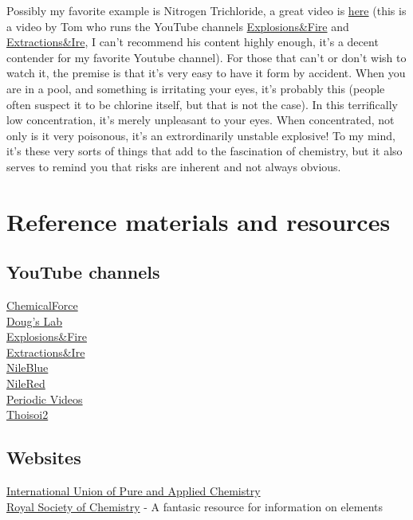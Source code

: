 \documentclass{book}
\begin{document}
Possibly my favorite example is Nitrogen Trichloride, a great video is \href{https://www.youtube.com/watch?v=mV_daaldE_I}{here} (this is a video by Tom who runs the YouTube channels \href{https://www.youtube.com/c/ExplosionsFire2}{Explosions\&Fire} and \href{https://www.youtube.com/c/ExtractionsIre}{Extractions\&Ire}, I can't recommend his content highly enough, it's a decent contender for my favorite Youtube channel).  For those that can't or don't wish to watch it, the premise is that it's very easy to have it form by accident.  When you are in a pool, and something is irritating your eyes, it's probably this (people often suspect it to be chlorine itself, but that is not the case).  In this terrifically low concentration, it's merely unpleasant to your eyes.  When concentrated, not only is it very poisonous, it's an extrordinarily unstable explosive!  To my mind, it's these very sorts of things that add to the fascination of chemistry, but it also serves to remind you that risks are inherent and not always obvious.\\
\section{Reference materials and resources}
\subsection{YouTube channels}
\href{https://www.youtube.com/c/ChemicalForce}{ChemicalForce}\\
\href{https://www.youtube.com/user/DougsLab}{Doug's Lab}\\
\href{https://www.youtube.com/c/ExplosionsFire2}{Explosions\&Fire}\\
\href{https://www.youtube.com/c/ExtractionsIre}{Extractions\&Ire}\\
\href{https://www.youtube.com/c/NileRed2}{NileBlue}\\
\href{https://www.youtube.com/c/NileRed}{NileRed}\\
\href{https://www.youtube.com/user/periodicvideose}{Periodic Videos}\\
\href{https://www.youtube.com/c/Thoisoi2}{Thoisoi2}\\
\subsection{Websites}
\href{https://iupac.org/}{International Union of Pure and Applied Chemistry}\\
\href{https://www.rsc.org/}{Royal Society of Chemistry} - A fantasic resource for information on elements\\
\end{document}
